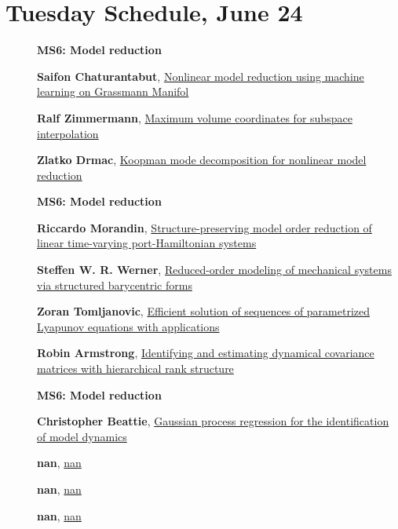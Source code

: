 \documentclass[ILAS2025-program.tex]{subfiles}
\begin{document}
    \newpage

\section*{Tuesday Schedule, June 24 }
        
        \begin{description}
    \item[] {\color{mstitle}\textbf{MS6: Model reduction}} 
    \item[] \hypertarget{up0129}{}\textbf{Saifon Chaturantabut}, \hyperlink{down0129}{Nonlinear model reduction using machine learning on Grassmann Manifol}
        \item[] \hypertarget{up0130}{}\textbf{Ralf Zimmermann}, \hyperlink{down0130}{Maximum volume coordinates for subspace interpolation}
        \item[] \hypertarget{up0131}{}\textbf{Zlatko Drmac}, \hyperlink{down0131}{Koopman mode decomposition for nonlinear model reduction}
        \end{description}
    \begin{description}
    \item[] {\color{mstitle}\textbf{MS6: Model reduction}} 
    \item[] \hypertarget{up0165}{}\textbf{Riccardo Morandin}, \hyperlink{down0165}{Structure-preserving model order reduction of linear time-varying port-Hamiltonian systems}
        \item[] \hypertarget{up0166}{}\textbf{Steffen W. R. Werner}, \hyperlink{down0166}{Reduced-order modeling of mechanical systems via structured barycentric forms}
        \item[] \hypertarget{up0167}{}\textbf{Zoran Tomljanovic}, \hyperlink{down0167}{Efficient solution of sequences of parametrized Lyapunov equations with applications}
        \item[] \hypertarget{up0168}{}\textbf{Robin Armstrong}, \hyperlink{down0168}{Identifying and estimating dynamical covariance matrices with hierarchical rank structure}
        \end{description}
    \begin{description}
    \item[] {\color{mstitle}\textbf{MS6: Model reduction}} 
    \item[] \hypertarget{up0209}{}\textbf{Christopher Beattie}, \hyperlink{down0209}{Gaussian process regression for the identification of model dynamics}
        \item[] \hypertarget{up0210}{}\textbf{nan}, \hyperlink{down0210}{nan}
        \item[] \hypertarget{up0211}{}\textbf{nan}, \hyperlink{down0211}{nan}
        \item[] \hypertarget{up0212}{}\textbf{nan}, \hyperlink{down0212}{nan}
        \end{description}
    \newpage
\end{document}
